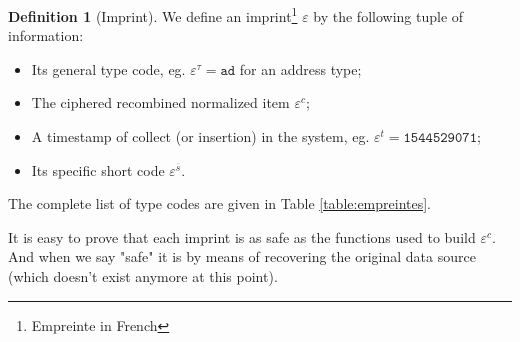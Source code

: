\documentclass[twoside,twocolumn]{article}
\theoremstyle{definition}
\newtheorem{definition}{Definition}
\theoremstyle{remark}
\begin{document}
\begin{definition}[Imprint]
    \label{imprint}
    We define an imprint\footnote{Empreinte in French} $\varepsilon$ by the following tuple of information:
    \begin{itemize}
        \item Its general type code, eg. $\varepsilon^\tau = \texttt{ad}$ for an address type;
        \item The ciphered recombined normalized item $\varepsilon^c$;
        \item A timestamp of collect (or insertion) in the system, eg. $\varepsilon^t = \texttt{1544529071}$;
        \item Its specific short code $\varepsilon^{\overline{s}}$.
    \end{itemize}

    The complete list of type codes are given in Table \ref{table:empreintes}.

    It is easy to prove that each imprint is as safe as the functions used to build $\varepsilon^c$.
    And when we say "safe" it is by means of recovering the original data source (which doesn't exist anymore at this point).
\end{definition}
\end{document}
